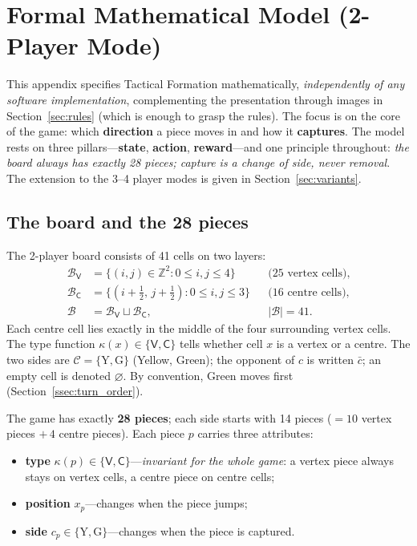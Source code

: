 \section{Formal Mathematical Model (2-Player Mode)}
\label{app:formal}

This appendix specifies Tactical Formation mathematically,
\emph{independently of any software implementation}, complementing the
presentation through images in Section~\ref{sec:rules} (which is
enough to grasp the rules). The focus is on the core of the game: which
\textbf{direction} a piece moves in and how it \textbf{captures}. The model
rests on three pillars---\textbf{state}, \textbf{action},
\textbf{reward}---and one principle throughout: \emph{the board always has
exactly 28 pieces; capture is a change of side, never removal}. The
extension to the 3--4 player modes is given in Section~\ref{sec:variants}.

\subsection{The board and the 28 pieces}
\label{ssec:board}

The 2-player board consists of 41 cells on two layers:
\begin{align}
\mathcal{B}_{\mathsf V}
  &= \{(i,j)\in\mathbb Z^2 : 0\le i,j\le 4\}
  && \text{(25 vertex cells)}, \label{eq:vert}\\
\mathcal{B}_{\mathsf C}
  &= \{(i{+}\tfrac12,\,j{+}\tfrac12) : 0\le i,j\le 3\}
  && \text{(16 centre cells)}, \label{eq:cent}\\
\mathcal{B}
  &= \mathcal{B}_{\mathsf V}\sqcup\mathcal{B}_{\mathsf C},
  && |\mathcal{B}|=41. \label{eq:board}
\end{align}
Each centre cell lies exactly in the middle of the four surrounding vertex
cells. The type function $\kappa(x)\in\{\mathsf V,\mathsf C\}$ tells whether
cell $x$ is a vertex or a centre. The two sides are $\mathcal C=\{\mathrm
Y,\mathrm G\}$ (Yellow, Green); the opponent of $c$ is written $\bar c$; an
empty cell is denoted $\varnothing$. By convention, Green moves first
(Section~\ref{ssec:turn_order}).

The game has exactly \textbf{28 pieces}; each side starts with 14 pieces
($=10$ vertex pieces $+\,4$ centre pieces). Each piece $p$ carries three
attributes:
\begin{itemize}[noitemsep,topsep=2pt]
  \item \textbf{type} $\kappa(p)\in\{\mathsf V,\mathsf C\}$---\emph{invariant
        for the whole game}: a vertex piece always stays on vertex cells, a
        centre piece on centre cells;
  \item \textbf{position} $x_p$---changes when the piece jumps;
  \item \textbf{side} $c_p\in\{\mathrm Y,\mathrm G\}$---changes when the
        piece is captured.
\end{itemize}

